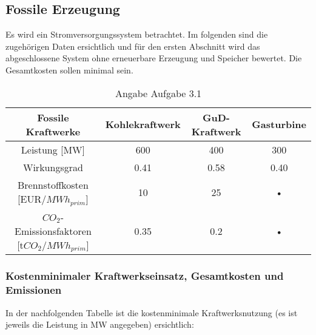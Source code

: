\documentclass{eegreport}
\begin{document}
\setcounter{section}{3}
\mytitlepage
{} 
\tableofcontents 
{} 

\newpage

\subsection{Fossile Erzeugung}

Es wird ein Stromversorgungssystem betrachtet. Im folgenden sind die zugehörigen Daten ersichtlich und für den ersten Abschnitt wird das abgeschlossene System ohne erneuerbare Erzeugung und Speicher bewertet. Die Gesamtkosten sollen minimal sein. \\

\begin{table}[h]
\begin{center}
\begin{tabular}{|c|c|c|c|}
\hline 
\textbf{Fossile Kraftwerke} & \textbf{Kohlekraftwerk} & \textbf{GuD-Kraftwerk} & \textbf{Gasturbine} \\ 
\hline 
Leistung [MW] & 600 & 400 & 300 \\ 
\hline 
Wirkungsgrad & 0.41 & 0.58 & 0.40 \\ 
\hline 
Brennstoffkosten [EUR/$MWh_{prim}$] & 10 & 25 & • \\ 
\hline 
$CO_2$-Emissionsfaktoren [t$CO_2$/$MWh_{prim}$] & 0.35 & 0.2 & • \\ 
\hline 
\end{tabular} 

\end{center}
\caption{Angabe Aufgabe 3.1}
\label{eos}
\end{table}
\newpage
\subsubsection{Kostenminimaler Kraftwerkseinsatz, Gesamtkosten und Emissionen}

In der nachfolgenden Tabelle ist die kostenminimale Kraftwerksnutzung (es ist jeweils die Leistung in MW angegeben) ersichtlich:
\end{document}
